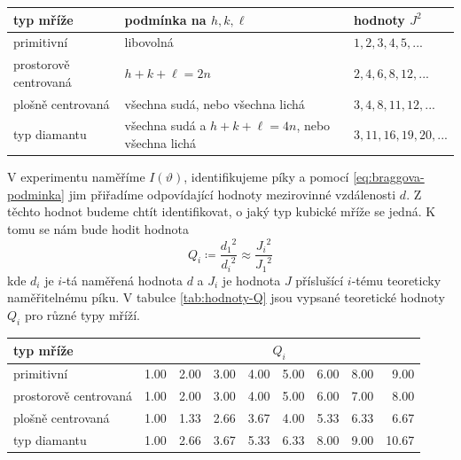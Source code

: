 \documentclass[10pt,a4paper]{article}
\newcommand{\°}{\degree}
\begin{document}
\phantom{.}
\begin{minipage}{\linewidth}
    \vspace{\baselineskip}
    \centering
    \begin{tabular}{ l|l|l }
        \bfseries typ mříže &
        \bfseries podmínka na $h,k,\ell$ &
        \bfseries hodnoty $J^2$
        \\\hline
        primitivní & libovolná & $1,2,3,4,5, ...$ \\
        prostorově centrovaná & $h+k+\ell = 2n$ & $2,4,6,8,12,...$ \\
        plošně centrovaná & všechna sudá, nebo všechna lichá & $3,4,8,11,12,...$ \\
        typ diamantu & všechna sudá a $h+k+\ell = 4n$, nebo všechna lichá & $3, 11, 16, 19, 20, ...$
    \end{tabular}
    \vspace{0.3\baselineskip}
    \label{tab:kubicke-mrize}
    \vspace{\baselineskip}
\end{minipage}

\noindent
V experimentu naměříme $I(\vartheta)$, identifikujeme píky a pomocí \eqref{eq:braggova-podminka} jim přiřadíme odpovídající hodnoty mezirovinné vzdálenosti $d$. Z těchto hodnot budeme chtít identifikovat, o jaký typ kubické mříže se jedná. K tomu se nám bude hodit hodnota
\begin{equation}
    Q_i
    \coloneqq \frac{ {d_1}^2 }{ {d_i}^2 }
    \approx \frac{ {J_i}^2 }{ {J_1}^2 }
\end{equation}
kde $d_i$ je $i$-tá naměřená hodnota $d$ a $J_i$ je hodnota $J$ příslušící $i$-tému teoreticky naměřitelnému píku. V tabulce \ref{tab:hodnoty-Q} jsou vypsané teoretické hodnoty $Q_i$ pro různé typy mříží.

\phantom{.}
\begin{minipage}{\linewidth}
    \vspace{\baselineskip}
    \centering
    \begin{tabular}{ l|rrrrrrrr }
        \bfseries typ mříže &
        \multicolumn{8}{c}{$Q_i$}
        \\\hline

        primitivní & 1.00 &	2.00 &	3.00 &	4.00 &	5.00 &	6.00 &	8.00 & 9.00 \\
        prostorově centrovaná & 1.00 &	2.00 &	3.00 &	4.00 &	5.00 &	6.00 &	7.00 &	8.00 \\
        plošně centrovaná & 1.00 &	1.33 &	2.66 &	3.67 &	4.00 &	5.33 &	6.33 &	6.67 \\
        typ diamantu & 1.00 &	2.66 &	3.67 &	5.33 &	6.33 &	8.00 &	9.00 &	10.67

    \end{tabular}
    \vspace{0.3\baselineskip}
    \label{tab:hodnoty-Q}
    \vspace{\baselineskip}
\end{minipage}
\end{document}
